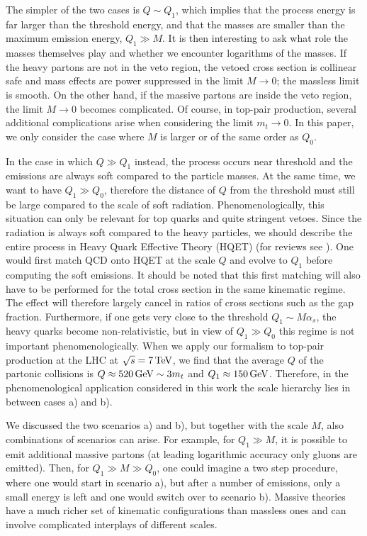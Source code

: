 \documentclass[11pt,a4paper]{article}
\begin{document}
The simpler of the two cases is $Q \sim Q_1$, which implies that the process energy is far larger than the  threshold energy, and that the masses are smaller than the maximum emission energy, $Q_1\gg M$. It is then interesting to ask what role the masses themselves play and whether we encounter logarithms of the masses. If the heavy partons are not in the veto region, the vetoed cross section is collinear safe and mass effects are power suppressed in the limit $M \to 0$; the massless limit is smooth. On the other hand, if the massive partons are inside the veto region, the limit $M \to 0$  becomes complicated. Of course, in top-pair production, several additional complications arise when considering the limit $m_t \to 0$. In this paper, we only consider the case where $M$ is larger or of the same order as $Q_0$. 

In the case in which $Q \gg Q_1$ instead, the process occurs near threshold and the emissions are always soft compared to the particle masses. At the same time, we want to have $Q_1 \gg Q_0$, therefore the distance of $Q$ from the threshold must still be large compared to the scale of soft radiation. Phenomenologically, this situation can only be relevant for top quarks and quite stringent vetoes. Since the radiation is always soft compared to the heavy particles, we should describe the entire process in Heavy Quark Effective Theory (HQET) (for reviews see \cite{Neubert:1993mb,Manohar:2000dt}). One would first match QCD onto HQET at the scale $Q$ and evolve to $Q_1$ before computing the soft emissions. It should be noted that this first matching will also have to be performed for the total cross section in the same kinematic regime. The effect will therefore largely cancel in ratios of cross sections such as the gap fraction. Furthermore,  if one gets very close to the threshold $Q_1 \sim M \alpha_s$, the heavy quarks become non-relativistic, but in view of $Q_1 \gg Q_0$ this regime is not important phenomenologically. When we apply our formalism to top-pair production at the LHC at $\sqrt{s}= 7\,{\rm TeV}$, we find that the average $Q$ of the partonic collisions is  $Q\approx 520 \,{\rm GeV} \sim 3 m_t$ and $Q_1 \approx 150 \,{\rm GeV}$. Therefore, in the phenomenological application considered in this work the scale hierarchy lies in between cases  a) and b).

We discussed the two scenarios a) and b), but together with the scale $M$, also combinations of scenarios can arise. For example, for $Q_1 \gg M$, it is possible to emit additional massive partons (at leading logarithmic accuracy only gluons are emitted). Then, for $Q_1 \gg M \gg Q_0$, one could imagine a two step procedure, where one would start in scenario a), but after a number of emissions, only a small energy is left and one would switch over to scenario b). Massive theories have a much richer set of kinematic configurations than massless ones and can involve complicated interplays of different scales. 
\end{document}
